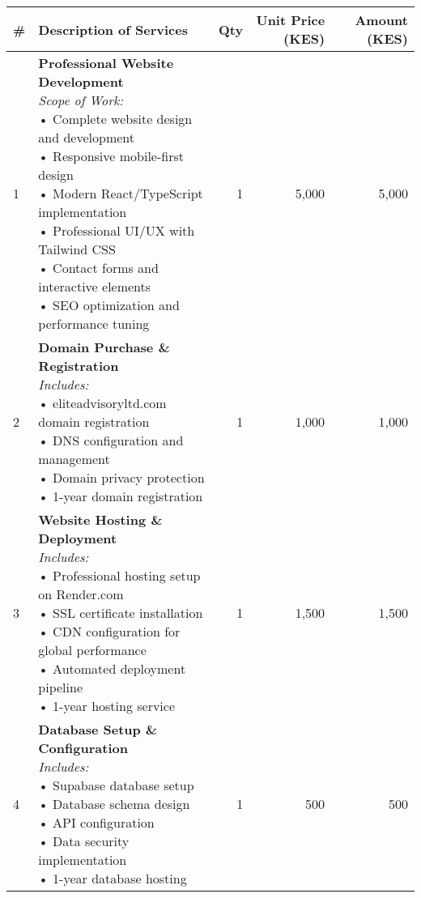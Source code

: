 \documentclass[11pt,a4paper]{article}
\begin{document}
\begin{tabularx}{\textwidth}{@{}p{1cm}Xrrr@{}}
    \toprule
    \textbf{\#} & \textbf{Description of Services} & \textbf{Qty} & \textbf{Unit Price (KES)} & \textbf{Amount (KES)} \\
    \midrule
     1 & \parbox[t]{8cm}{
         \textbf{Professional Website Development} \\
         \vspace{0.2cm}
         \textit{Scope of Work:} \\
         • Complete website design and development \\
         • Responsive mobile-first design \\
         • Modern React/TypeScript implementation \\
         • Professional UI/UX with Tailwind CSS \\
         • Contact forms and interactive elements \\
         • SEO optimization and performance tuning
     } & 1 & 5,000 & 5,000 \\
     
     2 & \parbox[t]{8cm}{
         \textbf{Domain Purchase \& Registration} \\
         \vspace{0.2cm}
         \textit{Includes:} \\
         • eliteadvisoryltd.com domain registration \\
         • DNS configuration and management \\
         • Domain privacy protection \\
         • 1-year domain registration
     } & 1 & 1,000 & 1,000 \\
     
     3 & \parbox[t]{8cm}{
         \textbf{Website Hosting \& Deployment} \\
         \vspace{0.2cm}
         \textit{Includes:} \\
         • Professional hosting setup on Render.com \\
         • SSL certificate installation \\
         • CDN configuration for global performance \\
         • Automated deployment pipeline \\
         • 1-year hosting service
     } & 1 & 1,500 & 1,500 \\
     
     4 & \parbox[t]{8cm}{
         \textbf{Database Setup \& Configuration} \\
         \vspace{0.2cm}
         \textit{Includes:} \\
         • Supabase database setup \\
         • Database schema design \\
         • API configuration \\
         • Data security implementation \\
         • 1-year database hosting
     } & 1 & 500 & 500 \\
     

\end{tabularx}
\end{document}
